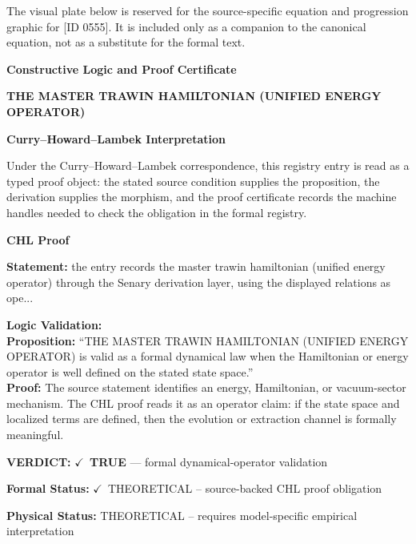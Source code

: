 \begingroup\footnotesize\sloppy
The visual plate below is reserved for the source-specific equation and progression graphic for [ID 0555]. It is included only as a companion to the canonical equation, not as a substitute for the formal text.
\par\endgroup
\ifTZPDarkEdition
{}
\fi

\clearpage
\begingroup\tzpsupportsetup
\noindent\textbf{\fontsize{10.8pt}{12.8pt}\selectfont [ID 0555] Constructive Logic and Proof Certificate}\par
\noindent\textbf{\fontsize{10pt}{12pt}\selectfont THE MASTER TRAWIN HAMILTONIAN (UNIFIED ENERGY OPERATOR)}\par
\vspace{0.45em}
\begingroup
\footnotesize
\setlength{\parskip}{0.22em}
\setlength{\parindent}{0pt}
\noindent\textbf{Curry--Howard--Lambek Interpretation}\par
Under the Curry--Howard--Lambek correspondence, this registry entry is read as a typed proof
object: the stated source condition supplies the proposition, the derivation supplies the
morphism, and the proof certificate records the machine handles needed to check the obligation
in the formal registry.

\vspace{0.45em}
\noindent\textbf{CHL Proof}\par
\textbf{Statement:} the entry records the master trawin hamiltonian (unified energy operator) through the
Senary derivation layer, using the displayed relations as ope...

\textbf{Logic Validation:}\\
\textbf{Proposition:} ``THE MASTER TRAWIN HAMILTONIAN (UNIFIED ENERGY OPERATOR) is valid as a formal dynamical
law when the Hamiltonian or energy operator is well defined on the stated state space.''\\
\textbf{Proof:} The source statement identifies an energy, Hamiltonian, or vacuum-sector mechanism. The
CHL proof reads it as an operator claim: if the state space and localized terms are
defined, then the evolution or extraction channel is formally meaningful.

\textbf{VERDICT:} \ensuremath{\checkmark}\ \textbf{TRUE} --- formal dynamical-operator validation

\textbf{Formal Status:} \ensuremath{\checkmark}\ THEORETICAL -- source-backed CHL proof obligation

\textbf{Physical Status:} THEORETICAL -- requires model-specific empirical interpretation
\par\vspace{0.45em}
\par
\ifTZPDarkEdition
{}
\fi
\endgroup
\endgroup
